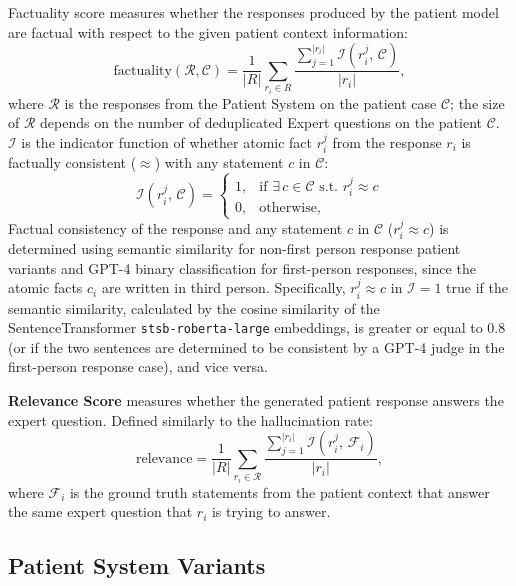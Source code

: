 Factuality score measures whether the responses produced by the patient model are factual with respect to the given patient context information:
\begin{equation}
    \text{factuality}(\mathcal{R},\mathcal{C}) = \frac1{|R|}\sum_{r_i\in R}\frac{\sum_{j=1}^{|r_i|}\mathcal{I}(r_i^j,\,\mathcal{C})}{|r_i|},
\end{equation}
where $\mathcal{R}$ is the responses from the Patient System on the patient case $\mathcal{C}$; the size of $\mathcal{R}$ depends on the number of deduplicated Expert questions on the patient $\mathcal{C}$. $\mathcal{I}$ is the indicator function of whether atomic fact $r_i^j$ from the response $r_i$ is factually consistent ($\approx$) with any statement $c$ in $\mathcal{C}$:
\begin{equation}
    \mathcal{I}(r_i^j,\,\mathcal{C}) = \begin{cases}
        1, & \text{if }\exists\, c\in\mathcal{C}\text{ s.t. }r_i^j\approx c\\
        0, & \text{otherwise,}
    \end{cases}
\end{equation}
Factual consistency of the response and any statement $c$ in $\mathcal{C}$ ($r_i^j\approx c$) is determined using semantic similarity for non-first person response patient variants and GPT-4 binary classification for first-person responses, 
since the atomic facts $c_i$ are written in third person. Specifically, $r_i^j\approx c$ in $\mathcal{I}=1$ true if the semantic similarity, calculated by the cosine similarity of the SentenceTransformer \texttt{stsb-roberta-large} embeddings, is greater or equal to $0.8$ (or if the two sentences are determined to be consistent by a GPT-4 judge in the first-person response case), and vice versa.

\textbf{Relevance Score} measures whether the generated patient response answers the expert question. Defined similarly to the hallucination rate:
\begin{equation}
    \text{relevance} = \frac1{|R|}\sum_{r_i\in \mathcal{R}}\frac{\sum_{j=1}^{|r_i|}\mathcal{I}(r_i^j,\,\mathcal{F}_i)}{|r_i|},
\end{equation}
where $\mathcal{F}_i$ is the ground truth statements from the patient context that answer the same expert question that $r_i$ is trying to answer.
\subsection{Patient System Variants}\label{app:patient_prompt}

